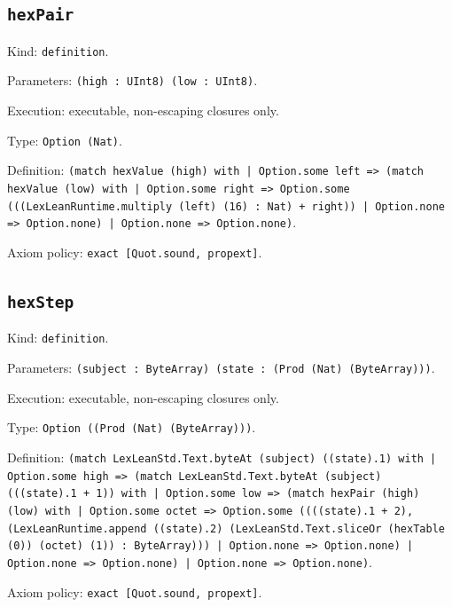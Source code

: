 \documentclass[11pt]{article}
\begin{document}
\subsection*{\texttt{hexPair}}
\noindent Kind: \texttt{definition}.\par
\noindent Parameters: \texttt{(high : UInt8) (low : UInt8)}.\par
\noindent Execution: executable, non-escaping closures only.\par
\noindent Type: \texttt{Option (Nat)}.\par
\noindent Definition: \texttt{(match hexValue (high) with | Option.some left => (match hexValue (low) with | Option.some right => Option.some (((LexLeanRuntime.multiply (left) (16) : Nat) + right)) | Option.none => Option.none) | Option.none => Option.none)}.\par
\noindent Axiom policy: \texttt{exact [Quot.sound, propext]}.\par
\subsection*{\texttt{hexStep}}
\noindent Kind: \texttt{definition}.\par
\noindent Parameters: \texttt{(subject : ByteArray) (state : (Prod (Nat) (ByteArray)))}.\par
\noindent Execution: executable, non-escaping closures only.\par
\noindent Type: \texttt{Option ((Prod (Nat) (ByteArray)))}.\par
\noindent Definition: \texttt{(match LexLeanStd.Text.byteAt (subject) ((state).1) with | Option.some high => (match LexLeanStd.Text.byteAt (subject) (((state).1 + 1)) with | Option.some low => (match hexPair (high) (low) with | Option.some octet => Option.some ((((state).1 + 2), (LexLeanRuntime.append ((state).2) (LexLeanStd.Text.sliceOr (hexTable (0)) (octet) (1)) : ByteArray))) | Option.none => Option.none) | Option.none => Option.none) | Option.none => Option.none)}.\par
\noindent Axiom policy: \texttt{exact [Quot.sound, propext]}.\par
\end{document}
